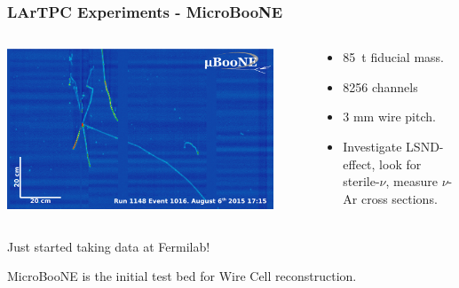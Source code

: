 \documentclass[xcolor=dvipsnames]{beamer}
\begin{document}
\begin{frame}
  \frametitle{LArTPC Experiments - MicroBooNE}

  \begin{columns}
    \begin{column}{0.5\textwidth}
      \begin{center}
        \includegraphics[width=0.9\textwidth]{run1148_ev1016.png}
      \end{center}

    \end{column}
    \begin{column}{0.5\textwidth}
      \begin{itemize}
      \item \SI{85}{\tonne} fiducial mass.
      \item 8256 channels
      \item 3 mm wire pitch.
      \item Investigate LSND-effect, look for sterile-$\nu$, measure $\nu$-Ar
        cross sections.
      \end{itemize}
    \end{column}
  \end{columns}

  \begin{center}
    Just started taking data at Fermilab!    
  \end{center}

  MicroBooNE is the initial test bed for Wire Cell reconstruction.

\end{frame}
\end{document}
